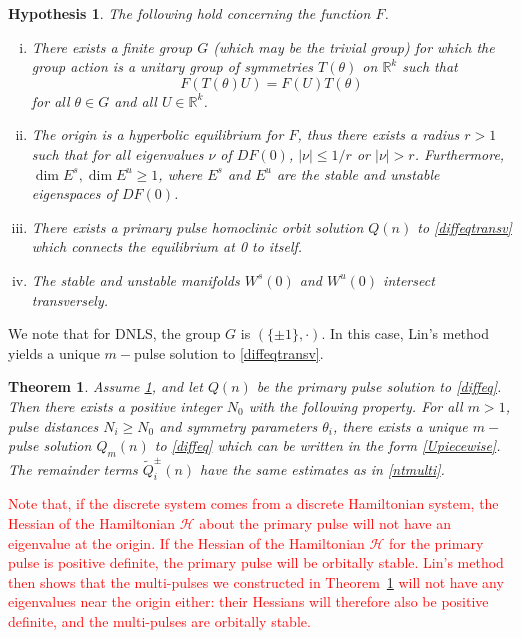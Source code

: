 \documentclass[12pt]{elsarticle}
\def\R{{\mathbb R}}
\newtheorem{theorem}{Theorem}
\newtheorem{hypothesis}{Hypothesis}
\newcommand{\revised}[1]{ \textcolor{red}{#1} }
\begin{document}
\begin{hypothesis}\label{transversehyp}
The following hold concerning the function $F$.
\begin{enumerate}[(i)]
\item There exists a finite group $G$ (which may be the trivial group) for which the group action is a unitary group of symmetries $T(\theta)$ on $\R^k$ such that 
\begin{equation}\label{symmetrytransverse}
F(T(\theta)U) = F(U)T(\theta)
\end{equation}
for all $\theta \in G$ and all $U \in \R^k$. 
\item The origin is a hyperbolic equilibrium for $F$, thus there exists a radius $r > 1$ such that for all eigenvalues $\nu$ of $DF(0)$, $|\nu| \leq 1/r$ or $|\nu| > r$. Furthermore, $\dim E^s, \dim E^u \geq 1$, where $E^s$ and $E^u$ are the stable and unstable eigenspaces of $DF(0)$.
\item There exists a primary pulse homoclinic orbit solution $Q(n)$ to \cref{diffeqtransv} which connects the equilibrium at 0 to itself.
\item The stable and unstable manifolds $W^s(0)$ and $W^u(0)$ intersect transversely.
\end{enumerate}
\end{hypothesis}
We note that for DNLS, the group $G$ is $( \{\pm 1\}, \cdot)$. In this case, Lin's method yields a unique $m-$pulse solution to \cref{diffeqtransv}.

\begin{theorem}\label{transversemulti}
Assume \cref{transversehyp}, and let $Q(n)$ be the primary pulse solution to \cref{diffeq}. Then there exists a positive integer $N_0$ with the following property. For all $m > 1$, pulse distances $N_i \geq N_0$ and symmetry parameters $\theta_i$, there exists a unique $m-$pulse solution $Q_m(n)$ to \cref{diffeq} which can be written in the form \cref{Upiecewise}. The remainder terms $\tilde{Q}_i^\pm(n)$ have the same estimates as in \cref{ntmulti}.
\end{theorem}

\revised{Note that, if the discrete system comes from a discrete Hamiltonian system, the Hessian of the Hamiltonian $\mathcal{H}$ about the primary pulse will not have an eigenvalue at the origin. If the Hessian of the Hamiltonian $\mathcal{H}$ for the primary pulse is positive definite, the primary pulse will be orbitally stable. Lin's method then shows that the multi-pulses we constructed in Theorem~\ref{transversemulti} will not have any eigenvalues near the origin either: their Hessians will therefore also be positive definite, and the multi-pulses are orbitally stable.}
\end{document}
